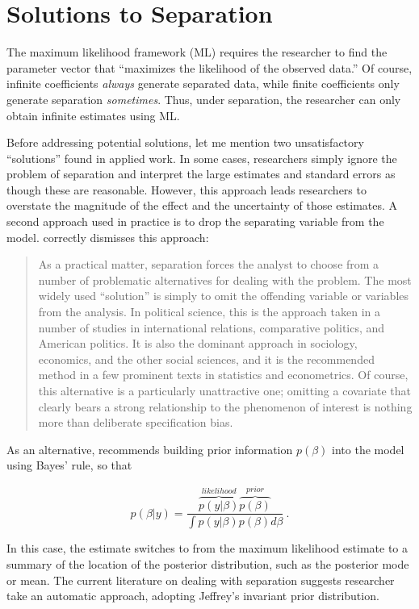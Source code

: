 \documentclass[12pt]{article}
\begin{document}
\section*{Solutions to Separation}

The maximum likelihood framework (ML) requires the researcher to find the parameter vector that ``maximizes the likelihood of the observed data.'' Of course, infinite coefficients \textit{always} generate separated data, while finite coefficients only generate separation \textit{sometimes}. Thus, under separation, the researcher can only obtain infinite estimates using ML.

Before addressing potential solutions, let me mention two unsatisfactory ``solutions'' found in applied work. In some cases, researchers simply ignore the problem of separation and interpret the large estimates and standard errors as though these are reasonable. However, this approach leads researchers to overstate the magnitude of the effect and the uncertainty of those estimates. A second approach used in practice is to drop the separating variable from the model. \cite{Zorn2005} correctly dismisses this approach:

\begin{quote}
As a practical matter, separation forces the analyst to choose from a number of problematic alternatives for dealing with the problem. The most widely used ``solution'' is simply to omit the offending variable or variables from the analysis. In political science, this is the approach taken in a number of studies in international relations, comparative politics, and American politics. It is also the dominant approach in sociology, economics, and the other social sciences, and it is the recommended method in a few prominent texts in statistics and econometrics. Of course, this alternative is a particularly unattractive one; omitting a covariate that clearly bears a strong relationship to the phenomenon of interest is nothing more than deliberate specification bias.
\end{quote}

As an alternative, \cite{Zorn2005} recommends building prior information $p(\beta)$ into the model using Bayes' rule, so that 

\begin{equation}\nonumber
p(\beta|y) = \dfrac{\overbrace{p(y|\beta)}^{likelihood}\overbrace{p(\beta)}^{prior}}{\int p(y|\beta)p(\beta) d\beta}~\text{.}
\end{equation}

\noindent In this case, the estimate switches to from the maximum likelihood estimate to a summary of the location of the posterior distribution, such as the posterior mode or mean. The current literature on dealing with separation suggests researcher take an automatic approach, adopting Jeffrey's invariant prior distribution.
\end{document}
